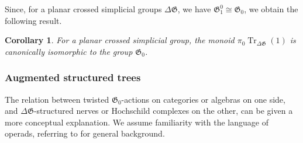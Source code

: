 \documentclass[english,11pt,leqno]{article}
\def\Gen{\mathfrak{G}}
\def\Hom{\operatorname{Hom}}
\def\on{\operatorname}
\def\Hom{\operatorname{Hom}}
\def\Tr{\on{Tr}}
\def\G{ {\mathcal G}}
\def\DG{ {\Delta \Gen}}
\newtheorem{cor}[thm]{Corollary}
\newtheorem{prop}[thm]{Proposition}
\theoremstyle{definition}
\theoremstyle{remark}
\numberwithin{equation}{section}
\begin{document}
Since, for a planar crossed simplicial groups $\DG$, we have $\Gen_1^0 \cong \Gen_0$, we obtain the
following result.

\begin{cor} For a planar crossed simplicial group, the monoid $\pi_0 \Tr_{\DG}(1)$ 
	is canonically isomorphic to the group $\Gen_0$.
\end{cor}
 
%
%
   
\subsubsection{Augmented structured trees}

The relation between twisted $\Gen_0$-actions on categories or algebras on one side, and
$\DG$-structured nerves or Hochschild complexes on the other, can be given a more conceptual
explanation. We assume familiarity with the language of operads, referring to \cite{loday-vallette}
for general background. 
\end{document}
